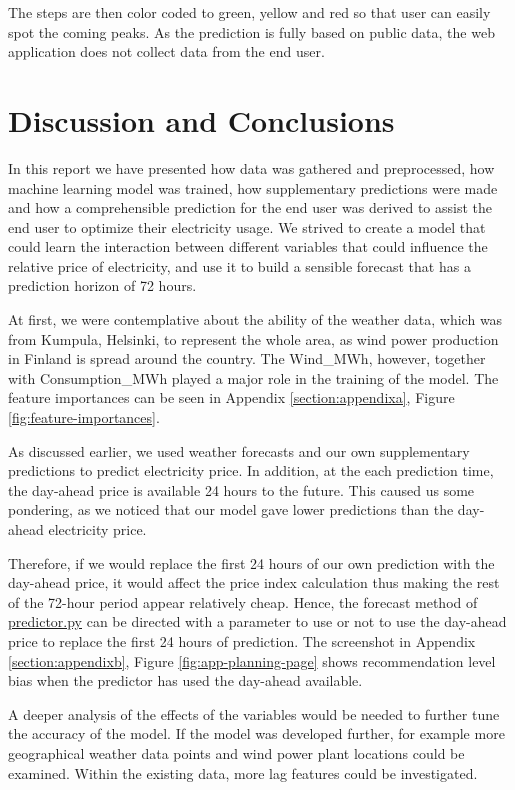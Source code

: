 \documentclass{article}
\begin{document}
The steps are then color coded to green, yellow and red so that user can easily spot the coming peaks. As the prediction is fully based on public data, the web application does not collect data from the end user.

\section{Discussion and Conclusions}
\label{section:conclusions}

In this report we have presented how data was gathered and preprocessed, how machine learning model was trained, how supplementary predictions were made and how a comprehensible prediction for the end user was derived to assist the end user to optimize their electricity usage. We strived to create a model that could learn the interaction between different variables that could influence the relative price of electricity, and use it to build a sensible forecast that has a prediction horizon of 72 hours.

At first, we were contemplative about the ability of the weather data, which was from Kumpula, Helsinki, to represent the whole area, as wind power production in Finland is spread around the country. The Wind\_MWh, however, together with Consumption\_MWh played a major role in the training of the model. The feature importances can be seen in Appendix \ref{section:appendixa}, Figure \ref{fig:feature-importances}.

As discussed earlier, we used weather forecasts and our own supplementary predictions to predict electricity price. In addition, at the each prediction time, the day-ahead price is available 24 hours to the future. This caused us some pondering, as we noticed that our model gave lower predictions than the day-ahead electricity price. 

Therefore, if we would replace the first 24 hours of our own prediction with the day-ahead price, it would affect the price index calculation thus making the rest of the 72-hour period appear relatively cheap. Hence, the forecast method of \href{https://github.com/IDS-mini/electricity/blob/main/src/app/predictor.py}{predictor.py} can be directed with a parameter to use or not to use the day-ahead price to replace the first 24 hours of prediction. The screenshot in Appendix \ref{section:appendixb}, Figure \ref{fig:app-planning-page} shows recommendation level bias when the predictor has used the day-ahead available.

A deeper analysis of the effects of the variables would be needed to further tune the accuracy of the model. If the model was developed further, for example more geographical weather data points and wind power plant locations could be examined. Within the existing data, more lag features could be investigated.
\end{document}
